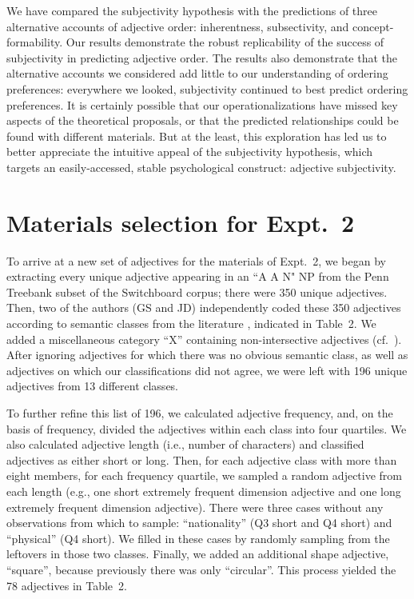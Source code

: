 \documentclass[12pt]{article}
\newcommand{\jd}[1]{\textcolor{red}{[jd: #1]}}
\begin{document}
We have compared the subjectivity hypothesis with the predictions of three alternative accounts of adjective order: inherentness, subsectivity, and concept-formability. Our results demonstrate the robust replicability of the success of subjectivity in predicting adjective order. The results also demonstrate that the alternative accounts we considered add little to our understanding of ordering preferences: everywhere we looked, subjectivity continued to best predict ordering preferences. %
It is certainly possible that our operationalizations have missed key aspects of the theoretical proposals, or that the predicted relationships could be found with different materials. 
But at the least, this exploration has led us to better appreciate the intuitive appeal of the subjectivity hypothesis, which targets an easily-accessed, stable psychological construct: adjective subjectivity.



\section{Materials selection for Expt.~2}

To arrive at a new set of adjectives for the materials of Expt.~2, we began by extracting every unique adjective appearing in an ``A A N" NP from the Penn Treebank subset of the Switchboard corpus; there were 350 unique adjectives. Then, two of the authors (GS and JD) independently coded these 350 adjectives according to semantic classes from the literature \citep[e.g.,][]{dixon1982,Sproat1991}, indicated in Table~2. We added a miscellaneous category ``X'' containing non-intersective adjectives (cf.~\citealp{Cinque2014}). After ignoring adjectives for which there was no obvious semantic class, as well as adjectives on which our classifications did not agree, we were left with 196 unique adjectives from 13 different classes.

To further refine this list of 196, we calculated adjective frequency, and, on the basis of frequency, divided the adjectives within each class into four quartiles. We also calculated adjective length (i.e., 
number of characters) and classified adjectives as either short or long. Then, for each adjective class with more than eight members, for each frequency quartile, we sampled a random adjective from each length (e.g., one short extremely frequent dimension adjective and one long extremely frequent dimension adjective). There were three cases without any observations from which to sample: ``nationality'' (Q3 short and Q4 short) and ``physical'' (Q4 short). We filled in these cases by randomly sampling from the leftovers in those two classes. Finally, we added an additional shape adjective, ``square'', because previously there was only ``circular''. This process yielded the 78 adjectives in Table~2.%
\end{document}
